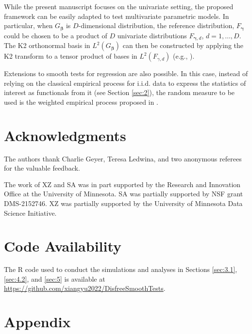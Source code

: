 \documentclass[11pt]{article}
\begin{document}
While the present manuscript focuses on the univariate setting, the proposed framework can be easily adapted to test multivariate parametric models. In particular, when $G_{\bm{\beta}}$ is $D$-dimensional distribution, the reference distribution, $F_{\bm{\gamma}}$ could be chosen to be a product of $D$ univariate distributions $F_{\bm{\gamma},d}$, $d=1,\dots,D$. The K2 orthonormal basis in $L^2(G_{\bm{\beta}})$ can then be constructed by applying the K2 transform to a tensor product of bases in $L^2(F_{\gamma,d})$ (e.g., \cite{algeri2021}). 

Extensions to smooth tests for regression \citep{inglot2006data, rayner2022smooth} are also possible. In this case, instead of relying on the classical empirical process for i.i.d. data to express the statistics of interest as functionals from it (see Section \ref{sec:2}),  the random measure to be used is the weighted empirical process proposed in  \cite{KHMALADZE2017348}.


\section{Acknowledgments}
The authors thank Charlie Geyer, Teresa Ledwina, and two anonymous referees for the valuable feedback.

The work of XZ and SA was in part supported by the Research and Innovation Office at the University of Minnesota. SA was partially supported by NSF grant DMS-2152746. XZ was partially supported by the University of Minnesota Data Science Initiative. 


\section{Code Availability}
The R code used to conduct the simulations and analyses in Sections \ref{sec:3.1}, \ref{sec:4.2}, and \ref{sec:5} is available at \url{https://github.com/xiangyu2022/DisfreeSmoothTests}.

\appendix
\section*{Appendix} 
\end{document}
